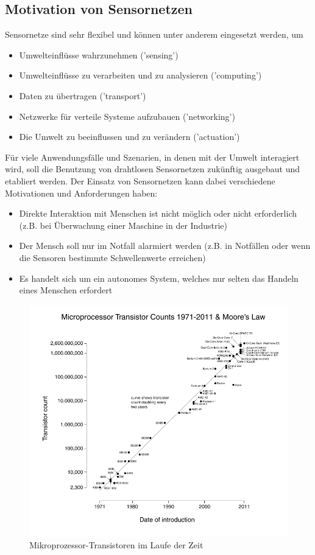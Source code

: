 \subsection{Motivation von Sensornetzen}\label{ss:MotivationSensornetze}

Sensornetze sind sehr flexibel und können unter anderem eingesetzt werden, um
\begin{itemize}
	\item Umwelteinflüsse wahrzunehmen ('sensing')
	\item Umwelteinflüsse zu verarbeiten und zu analysieren ('computing')
	\item Daten zu übertragen ('transport')
	\item Netzwerke für verteile Systeme aufzubauen ('networking')
	\item Die Umwelt zu beeinflussen und zu verändern ('actuation')
\end{itemize}

F\"ur viele Anwendungsfälle und Szenarien, in denen mit der Umwelt interagiert wird, soll die Benutzung von drahtlosen Sensornetzen zukünftig ausgebaut und etabliert werden. Der Einsatz von Sensornetzen kann dabei verschiedene Motivationen und Anforderungen haben:
\begin{itemize}
	\item Direkte Interaktion mit Menschen ist nicht möglich oder nicht erforderlich (z.B. bei Überwachung einer Maschine in der Industrie)
	\item Der Mensch soll nur im Notfall alarmiert werden (z.B. in Notfällen oder wenn die Sensoren bestimmte Schwellenwerte erreichen)
	\item Es handelt sich um ein autonomes System, welches nur selten das Handeln eines Menschen erfordert
\end{itemize}

\begin{figure}[H] 
	\centering
	\includegraphics[scale=0.5]{Bilder/mooreslaw}
	\caption{Mikroprozessor-Transistoren im Laufe der Zeit\cite{i:mooreslaw}}
	\label{f:mooreslaw}
\end{figure}

